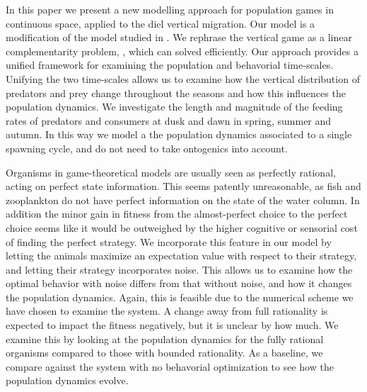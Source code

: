 In this paper we present a new modelling approach for population games in continuous space, applied to the diel vertical migration. Our model is a modification of the model studied in \citep{verticalmigration}. We rephrase the vertical game as a linear complementarity problem, \citep{miller1991copositive}, which can solved efficiently. Our approach provides a unified framework for examining the population and behavorial time-scales.  Unifying the two time-scales allows us to examine how the vertical distribution of predators and prey change throughout the seasons and how this influences the population dynamics. We investigate the length and magnitude of the feeding rates of predators and consumers at dusk and dawn in spring, summer and autumn. In this way we model a the population dynamics associated to a single spawning cycle, and do not need to take ontogenics into account.

Organisms in game-theoretical models are usually seen as perfectly rational, acting on perfect state information. This seems patently unreasonable, as fish and zooplankton do not have perfect information on the state of the water column. In addition the minor gain in fitness from the almost-perfect choice to the perfect choice seems like it would be outweighed by the higher cognitive or sensorial cost of finding the perfect strategy.
 We incorporate this feature in our model by letting the animals maximize an expectation value with respect to their strategy, and letting their strategy incorporates noise. This allows us to examine how the optimal behavior with noise differs from that without noise, and how it changes the population dynamics. Again, this is feasible due to the numerical scheme we have chosen to examine the system. A change away from full rationality is expected to impact the fitness negatively, but it is unclear by how much. We examine this by looking at the population dynamics for the fully rational organisms compared to those with bounded rationality. As a baseline, we compare against the system with no behavorial optimization to see how the population dynamics evolve.












